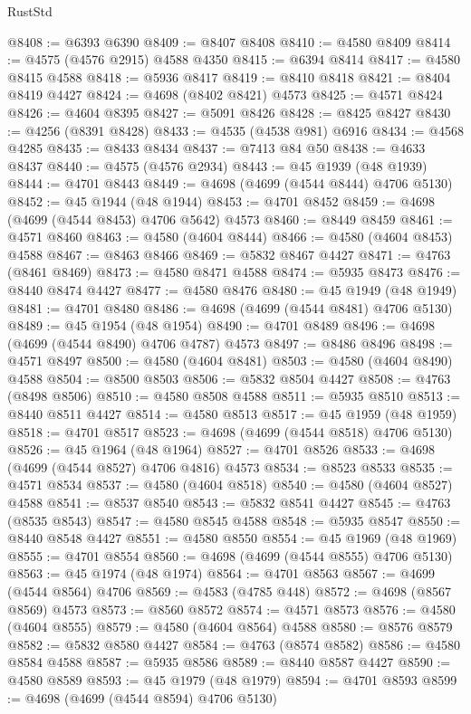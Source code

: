 \begin{lexlean}{RustStd}
\begin{coremodule}
@8408 := @6393 @6390
@8409 := @8407 @8408
@8410 := @4580 @8409
@8414 := @4575 (@4576 @2915) @4588 @4350
@8415 := @6394 @8414
@8417 := @4580 @8415 @4588
@8418 := @5936 @8417
@8419 := @8410 @8418
@8421 := @8404 @8419 @4427
@8424 := @4698 (@8402 @8421) @4573
@8425 := @4571 @8424
@8426 := @4604 @8395
@8427 := @5091 @8426
@8428 := @8425 @8427
@8430 := @4256 (@8391 @8428)
@8433 := @4535 (@4538 @981) @6916
@8434 := @4568 @4285
@8435 := @8433 @8434
@8437 := @7413 @84 @50
@8438 := @4633 @8437
@8440 := @4575 (@4576 @2934)
@8443 := @45 @1939 (@48 @1939)
@8444 := @4701 @8443
@8449 := @4698 (@4699 (@4544 @8444) @4706 @5130)
@8452 := @45 @1944 (@48 @1944)
@8453 := @4701 @8452
@8459 := @4698 (@4699 (@4544 @8453) @4706 @5642) @4573
@8460 := @8449 @8459
@8461 := @4571 @8460
@8463 := @4580 (@4604 @8444)
@8466 := @4580 (@4604 @8453) @4588
@8467 := @8463 @8466
@8469 := @5832 @8467 @4427
@8471 := @4763 (@8461 @8469)
@8473 := @4580 @8471 @4588
@8474 := @5935 @8473
@8476 := @8440 @8474 @4427
@8477 := @4580 @8476
@8480 := @45 @1949 (@48 @1949)
@8481 := @4701 @8480
@8486 := @4698 (@4699 (@4544 @8481) @4706 @5130)
@8489 := @45 @1954 (@48 @1954)
@8490 := @4701 @8489
@8496 := @4698 (@4699 (@4544 @8490) @4706 @4787) @4573
@8497 := @8486 @8496
@8498 := @4571 @8497
@8500 := @4580 (@4604 @8481)
@8503 := @4580 (@4604 @8490) @4588
@8504 := @8500 @8503
@8506 := @5832 @8504 @4427
@8508 := @4763 (@8498 @8506)
@8510 := @4580 @8508 @4588
@8511 := @5935 @8510
@8513 := @8440 @8511 @4427
@8514 := @4580 @8513
@8517 := @45 @1959 (@48 @1959)
@8518 := @4701 @8517
@8523 := @4698 (@4699 (@4544 @8518) @4706 @5130)
@8526 := @45 @1964 (@48 @1964)
@8527 := @4701 @8526
@8533 := @4698 (@4699 (@4544 @8527) @4706 @4816) @4573
@8534 := @8523 @8533
@8535 := @4571 @8534
@8537 := @4580 (@4604 @8518)
@8540 := @4580 (@4604 @8527) @4588
@8541 := @8537 @8540
@8543 := @5832 @8541 @4427
@8545 := @4763 (@8535 @8543)
@8547 := @4580 @8545 @4588
@8548 := @5935 @8547
@8550 := @8440 @8548 @4427
@8551 := @4580 @8550
@8554 := @45 @1969 (@48 @1969)
@8555 := @4701 @8554
@8560 := @4698 (@4699 (@4544 @8555) @4706 @5130)
@8563 := @45 @1974 (@48 @1974)
@8564 := @4701 @8563
@8567 := @4699 (@4544 @8564) @4706
@8569 := @4583 (@4785 @448)
@8572 := @4698 (@8567 @8569) @4573
@8573 := @8560 @8572
@8574 := @4571 @8573
@8576 := @4580 (@4604 @8555)
@8579 := @4580 (@4604 @8564) @4588
@8580 := @8576 @8579
@8582 := @5832 @8580 @4427
@8584 := @4763 (@8574 @8582)
@8586 := @4580 @8584 @4588
@8587 := @5935 @8586
@8589 := @8440 @8587 @4427
@8590 := @4580 @8589
@8593 := @45 @1979 (@48 @1979)
@8594 := @4701 @8593
@8599 := @4698 (@4699 (@4544 @8594) @4706 @5130)

\end{coremodule}
\end{lexlean}
